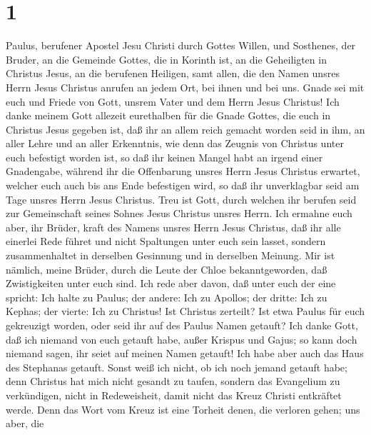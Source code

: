\hypertarget{section}{%
\section{1}\label{section}}

 Paulus, berufener Apostel Jesu Christi durch Gottes
Willen, und Sosthenes, der Bruder,  an die Gemeinde
Gottes, die in Korinth ist, an die Geheiligten in Christus Jesus, an die
berufenen Heiligen, samt allen, die den Namen unsres Herrn Jesus
Christus anrufen an jedem Ort, bei ihnen und bei uns. 
Gnade sei mit euch und Friede von Gott, unsrem Vater und dem Herrn Jesus
Christus!  Ich danke meinem Gott allezeit eurethalben für
die Gnade Gottes, die euch in Christus Jesus gegeben ist, 
daß ihr an allem reich gemacht worden seid in ihm, an aller Lehre und an
aller Erkenntnis,  wie denn das Zeugnis von Christus unter
euch befestigt worden ist,  so daß ihr keinen Mangel habt
an irgend einer Gnadengabe, während ihr die Offenbarung unsres Herrn
Jesus Christus erwartet,  welcher euch auch bis ans Ende
befestigen wird, so daß ihr unverklagbar seid am Tage unsres Herrn Jesus
Christus.  Treu ist Gott, durch welchen ihr berufen seid
zur Gemeinschaft seines Sohnes Jesus Christus unsres Herrn.
 Ich ermahne euch aber, ihr Brüder, kraft des Namens
unsres Herrn Jesus Christus, daß ihr alle einerlei Rede führet und nicht
Spaltungen unter euch sein lasset, sondern zusammenhaltet in derselben
Gesinnung und in derselben Meinung.  Mir ist nämlich,
meine Brüder, durch die Leute der Chloe bekanntgeworden, daß
Zwistigkeiten unter euch sind.  Ich rede aber davon, daß
unter euch der eine spricht: Ich halte zu Paulus; der andere: Ich zu
Apollos; der dritte: Ich zu Kephas; der vierte: Ich zu Christus!
 Ist Christus zerteilt? Ist etwa Paulus für euch
gekreuzigt worden, oder seid ihr auf des Paulus Namen getauft?
 Ich danke Gott, daß ich niemand von euch getauft habe,
außer Krispus und Gajus;  so kann doch niemand sagen, ihr
seiet auf meinen Namen getauft!  Ich habe aber auch das
Haus des Stephanas getauft. Sonst weiß ich nicht, ob ich noch jemand
getauft habe;  denn Christus hat mich nicht gesandt zu
taufen, sondern das Evangelium zu verkündigen, nicht in Redeweisheit,
damit nicht das Kreuz Christi entkräftet werde.  Denn das
Wort vom Kreuz ist eine Torheit denen, die verloren gehen; uns aber, die
